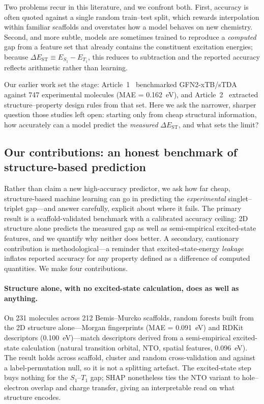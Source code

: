 Two problems recur in this literature, and we confront both. First, accuracy is
often quoted against a single random train--test split, which rewards
interpolation within familiar scaffolds and overstates how a model behaves on new
chemistry. Second, and more subtle, models are sometimes trained to reproduce a
\emph{computed} gap from a feature set that already contains the constituent
excitation energies; because $\Delta E_\text{ST}\equiv E_{S_1}-E_{T_1}$, this
reduces to subtraction and the reported accuracy reflects arithmetic rather than
learning.

Our earlier work set the stage: Article~1~\cite{Tchapet2024_xTB} benchmarked
GFN2-xTB/sTDA against \num{747} experimental molecules
(MAE = \qty{0.162}{\electronvolt}), and Article~2~\cite{Tchapet2024_DataDriven}
extracted structure--property design rules from that set. Here we ask the
narrower, sharper question those studies left open: starting only from cheap
structural information, how accurately can a model predict the \emph{measured}
$\Delta E_\text{ST}$, and what sets the limit?

\subsection{Our contributions: an honest benchmark of structure-based prediction}

Rather than claim a new high-accuracy predictor, we ask how far cheap,
structure-based machine learning can go in predicting the \emph{experimental}
singlet--triplet gap---and answer carefully, explicit about where it fails. The
primary result is a scaffold-validated benchmark with a calibrated accuracy ceiling:
2D structure alone predicts the measured gap as well as semi-empirical excited-state
features, and we quantify why neither does better. A secondary, cautionary
contribution is methodological---a reminder that excited-state-energy \emph{leakage}
inflates reported accuracy for any property defined as a difference of computed
quantities. We make four contributions.

\paragraph{Structure alone, with no excited-state calculation, does as well as anything.}
On \num{231} molecules across \num{212} Bemis--Murcko scaffolds, random forests built
from the 2D structure alone---Morgan fingerprints (MAE = \qty{0.091}{\electronvolt}) and
RDKit descriptors (\qty{0.100}{\electronvolt})---match descriptors derived from a
semi-empirical excited-state calculation (natural transition orbital, NTO, spatial
features, \qty{0.096}{\electronvolt}). The result holds across scaffold, cluster and random
cross-validation and against a label-permutation null, so it is not a splitting
artefact. The excited-state step buys nothing for the $S_1$--$T_1$ gap; SHAP nonetheless
ties the NTO variant to hole--electron overlap and charge transfer, giving an
interpretable read on what structure encodes.

